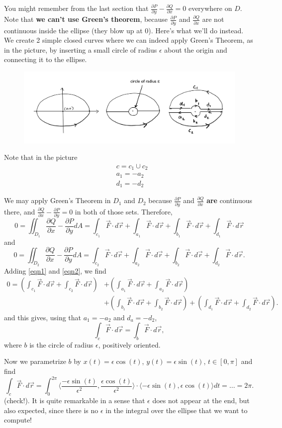\documentclass[12pt]{article}
\newcommand{\p}{\partial}
\newcommand{\e}{\epsilon}
\newcommand{\vr}{\vec{r}{}}
\newcommand{\vF}{\vec{F}}
\renewcommand{\lg}{\langle}
\newcommand{\rg}{\rangle}
\newcommand{\Q}{\frac{\p Q}{\p x}}
\renewcommand{\P}{\frac{\p P}{\p y}}
\newcommand{\Fline}{\vF\cdot d\vr}
\begin{document}
You might remember from the last section that $\P-\Q=0$ everywhere on $D$. Note that \textbf{we can't use Green's theorem}, because $\P$ and $\Q$ are not continuous inside the ellipse (they blow up at 0). Here's what we'll do instead. We create 2 simple closed curves where we can indeed apply Green's Theorem, as in the picture, by inserting a small circle of radius $\e $ about the origin and connecting it to the ellipse.

\begin{figure}[h]
\includegraphics[scale=.3]{last.jpg}
\end{figure}


Note that in the picture \begin{align*}
&c= c_1\cup c_2\\
&a_1=-a_2\\
&d_1=-d_2
\end{align*}

We may apply Green's Theorem in $D_1$ and $D_2$ because $\P$ and $\Q$ \textbf{are} continuous there, and  $\Q-\P=0$ in both of those sets. Therefore,
\begin{equation}
\label{eqn1} 0=\iint_{D_1}\Q-\P dA=\int_{c_1}\vF\cdot d\vr+\int_{a_1}\Fline +\int_{b_1}\Fline+\int_{d_1}\Fline
\end{equation}
and \begin{equation}
\label{eqn2} 0=\iint_{D_2}\Q-\P dA=\int_{c_2}\vF\cdot d\vr+\int_{a_2}\Fline +\int_{b_2}\Fline+\int_{d_2}\Fline.
\end{equation}
Adding \eqref{eqn1} and \eqref{eqn2}, we find \begin{align*}
0=\left (\int_{c_1}\vF\cdot d\vr+\int_{c_2}\vF\cdot d\vr\right )&+\left (\int_{a_1}\Fline +\int_{a_2}\Fline\right )\\&+\left (\int_{b_1}\Fline+\int_{b_2}\Fline\right )+\left (\int_{d_1}\Fline+\int_{d_2}\Fline\right ).
\end{align*}
and this gives, using that $a_1=-a_2$ and $d_a=-d_2$, $$\int_c\Fline=\int_b\Fline,$$ where $b$ is the circle of radius $\e$, positively oriented.

Now we parametrize $b$ by $x(t)=\e\cos(t)$, $y(t)=\e\sin(t)$, $t\in [0,\pi]$ and find $$\int_c\Fline =\int_0^{2\pi}\lg\frac{-\e \sin(t)}{\e^2},\frac{\e\cos(t)}{\e^2}\rg\cdot\lg -\e\sin(t),\e\cos(t)\rg dt=\dots=2\pi.$$
(check!). It is quite remarkable in a sense that $\e$ does not appear at the end, but also expected, since there is no $\e$ in the integral over the ellipse that we want to compute!
\end{document}
